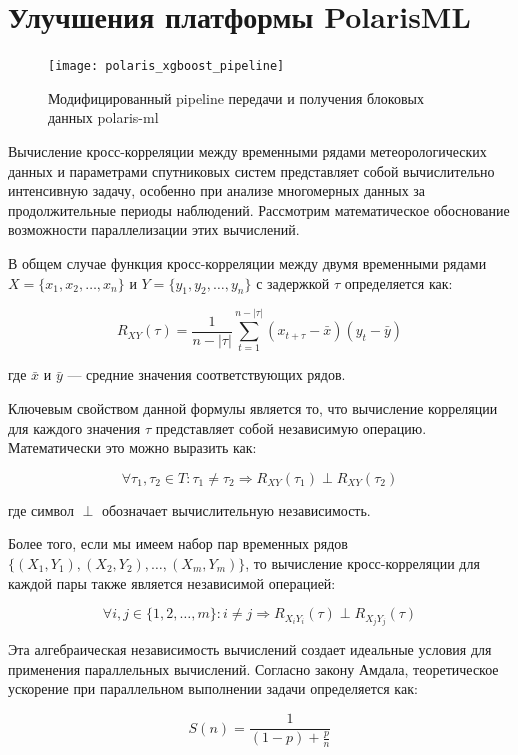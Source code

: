 \section{Улучшения платформы PolarisML}

\begin{figure}[!htbp]
	\centering
	\texttt{[image: polaris\_xgboost\_pipeline]}
	~\caption{Модифицированный pipeline передачи и получения блоковых данных polaris-ml}
	\label{fig:polaris_xgboost_pipeline}
\end{figure}

Вычисление кросс-корреляции между временными рядами метеорологических данных и параметрами спутниковых систем представляет собой вычислительно интенсивную задачу, особенно при анализе многомерных данных за продолжительные периоды наблюдений. Рассмотрим математическое обоснование возможности параллелизации этих вычислений.

В общем случае функция кросс-корреляции между двумя временными рядами $X = \{x_1, x_2, \ldots, x_n\}$ и $Y = \{y_1, y_2, \ldots, y_n\}$ с задержкой $\tau$ определяется как:

\[
R_{XY}(\tau) = \frac{1}{n-|\tau|} \sum_{t=1}^{n-|\tau|} (x_{t+\tau} - \bar{x})(y_t - \bar{y})
\]

где $\bar{x}$ и $\bar{y}$ — средние значения соответствующих рядов.

Ключевым свойством данной формулы является то, что вычисление корреляции для каждого значения $\tau$ представляет собой независимую операцию. Математически это можно выразить как:

\[
\forall \tau_1, \tau_2 \in T: \tau_1 \neq \tau_2 \Rightarrow R_{XY}(\tau_1) \perp R_{XY}(\tau_2)
\]

где символ $\perp$ обозначает вычислительную независимость.

Более того, если мы имеем набор пар временных рядов $\{(X_1, Y_1), (X_2, Y_2), \ldots, (X_m, Y_m)\}$, то вычисление кросс-корреляции для каждой пары также является независимой операцией:

\[
\forall i, j \in \{1, 2, \ldots, m\}: i \neq j \Rightarrow R_{X_i Y_i}(\tau) \perp R_{X_j Y_j}(\tau)
\]

Эта алгебраическая независимость вычислений создает идеальные условия для применения параллельных вычислений. Согласно закону Амдала, теоретическое ускорение при параллельном выполнении задачи определяется как:

\[
S(n) = \frac{1}{(1-p) + \frac{p}{n}}
\]

